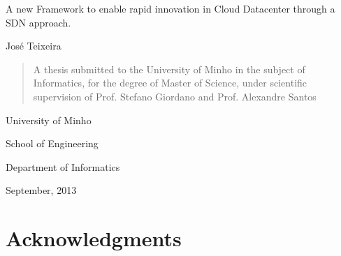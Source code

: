 \documentclass[12pt,english]{book}
\begin{document}
\begin{minipage}[c]{1.0\columnwidth}%
\begin{doublespace}
\vspace{2cm}
\begin{center}{\huge A new Framework to enable rapid innovation in Cloud Datacenter through a SDN approach.}\end{center}{\huge \par}
\end{doublespace}

\vspace{2cm}
\begin{center}{\large Jos\'{e} Teixeira}\end{center}{\large \par}
\vspace{2cm}

\begin{quote}
\begin{center}A thesis submitted to the University of Minho in the
subject of Informatics, for the degree of
Master of Science, under scientific supervision of Prof. Stefano Giordano and Prof. Alexandre Santos\end{center}\vspace{3cm}

\end{quote}
\begin{singlespace}
\begin{center}University of Minho\end{center}

\begin{center}School of Engineering\end{center}

\begin{center}Department of Informatics\end{center}
\end{singlespace}

\begin{center}{\large September, 2013}\end{center}\end{minipage}%
\thispagestyle{empty}



\newpage


\chapter*{Acknowledgments}
\end{document}
